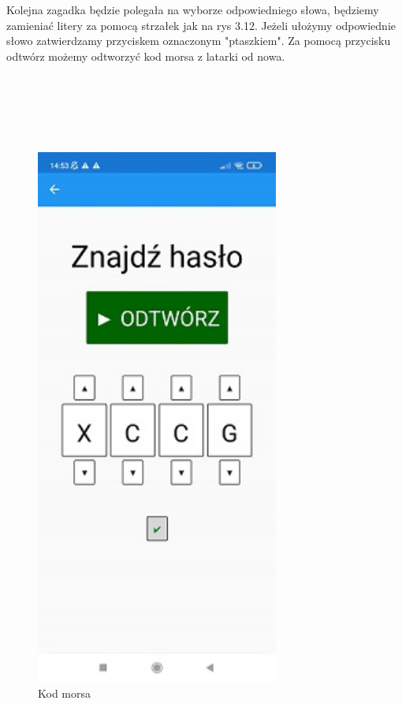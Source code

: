 \hspace{-0.60cm}Kolejna zagadka będzie polegała na wyborze odpowiedniego słowa, będziemy zamieniać litery za pomocą strzałek jak na rys 3.12. Jeżeli ułożymy odpowiednie słowo zatwierdzamy przyciskem oznaczonym "ptaszkiem". Za pomocą przycisku odtwórz możemy odtworzyć kod morsa z latarki od nowa. 
\\
\\
\\
\\
\\
\\
	\begin{figure}[!htb]
	\begin{center}
		\includegraphics[width=8cm]{rys/gra8.png}
		\caption{Kod morsa}
		\label{rys:rysunek001}
	\end{center}
\end{figure}

